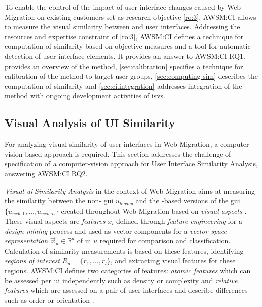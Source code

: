 To enable the control of the impact of user interface changes caused by \gls{Web Migration} on existing customers set as research objective \cref{ro:3}, AWSM:CI allows to measure the visual similarity between \legacy and \web user interfaces.
Addressing the resources and expertise constraint of \cref{ro:3}, AWSM:CI defines a technique for computation of similarity based on objective measures and a tool for automatic detection of user interface elements.
It provides an answer to AWSM:CI RQ1.
 provides an overview of the method, \cref{sec:calibration} specifies a technique for calibration of the method to target user groups, \cref{sec:computing-sim} describes the computation of similarity and \cref{sec:ci.integration} addresses integration of the method with ongoing development activities of \glspl{isv}.

\hypertarget{sec:visual-analysis.overview}{%
\subsection{Visual Analysis of UI Similarity}\label{sec:visual-analysis.overview}}
\vspace{5pt}

For analyzing visual similarity of user interfaces in \gls{Web Migration}, a computer-vision based approach is required.
This section addresses the challenge of specification of a computer-vision approach for User Interface Similarity Analysis, answering AWSM:CI RQ2.

\emph{Visual \gls{ui} Similarity Analysis} in the context of \gls{Web Migration} aims at measuring the similarity between the non-  \gls{gui} \(u_{legacy}\) and the -based versions of the \gls{gui} \(\{u_{web,1}, \ldots, u_{web,n}\}\) created throughout \gls{Web Migration} based on \emph{visual aspects} \autocite{Heil2016Similarity,Bakaev2017Kansei}.
These visual aspects are \emph{features} \(x_i\) defined through \emph{feature engineering} for a \emph{design mining} process \autocite{Bakaev2017WebIntelligence} and used as vector components for a \emph{vector-space representation} \(\vec x_u \in \mathbb{R}^d\) of \gls{ui} \(u\) required for comparison and classification.
Calculation of similarity measurements is based on these features, identifying \emph{regions of interest} \(R_u=\{r_1, \ldots, r_l\}\), and extracting visual features for these regions.
AWSM:CI defines two categories of features: \emph{atomic features} \autocite[equivalent to \emph{base measures}][]{ISO/IEEE2017Measurement} which can be assessed per \gls{ui} independently such as density \autocite{Heil2016Similarity} or complexity \autocite{Bakaev2017Kansei} and \emph{relative features} \autocite[equivalent to \emph{derived measures}][]{ISO/IEEE2017Measurement} which are assessed on a pair of user interfaces and describe differences such as order or orientation \autocite{Heil2016Similarity}.

